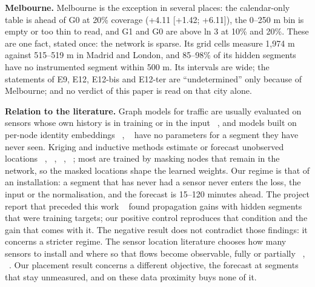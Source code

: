 \textbf{Melbourne.} Melbourne is the exception in several places: the calendar-only table is ahead of G0 at 20\% coverage (+4.11 [+1.42; +6.11]), the 0–250 m bin is empty or too thin to read, and G1 and G0 are above ln 3 at 10\% and 20\%. These are one fact, stated once: the network is sparse. Its grid cells measure 1,974 m against 515–519 m in Madrid and London, and 85–98\% of its hidden segments have no instrumented segment within 500 m. Its intervals are wide; the statements of E9, E12, E12-bis and E12-ter are ``undetermined'' only because of Melbourne; and no verdict of this paper is read on that city alone.

\textbf{Relation to the literature.} Graph models for traffic are usually evaluated on sensors whose own history is in training or in the input ~\cite{wu2019gwnet}, and models built on per-node identity embeddings ~\cite{shao2022stid}, ~\cite{liu2023staeformer} have no parameters for a segment they have never seen. Kriging and inductive methods estimate or forecast unobserved locations ~\cite{wu2021ignnk}, ~\cite{zhou2026track}, ~\cite{prabowo2024scpt}, ~\cite{zhou2025mogernn}; most are trained by masking nodes that remain in the network, so the masked locations shape the learned weights. Our regime is that of an installation: a segment that has never had a sensor never enters the loss, the input or the normalisation, and the forecast is 15–120 minutes ahead. The project report that preceded this work ~\cite{motion2026uc04} found propagation gains with hidden segments that were training targets; our positive control reproduces that condition and the gain that comes with it. The negative result does not contradict those findings: it concerns a stricter regime. The sensor location literature chooses how many sensors to install and where so that flows become observable, fully or partially ~\cite{viti2014partial}, ~\cite{owais2022tslp}. Our placement result concerns a different objective, the forecast at segments that stay unmeasured, and on these data proximity buys none of it.

